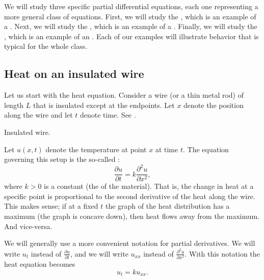 We will study three specific
partial differential equations, each one representing a
more general class of equations.  First, we will study the
\emph{}, which is an example of
a \emph{}.  Next, we will study the
\emph{}, which is an example of
a \emph{}.  Finally, we will study the
\emph{}, which is an example of
an \emph{}.  Each of our examples will illustrate
behavior that is typical for the whole class.

\subsection{Heat on an insulated wire}

Let us start with the heat equation.
Consider a wire (or a thin metal rod) of length $L$
that is insulated
except at the
endpoints.  Let $x$ denote the position along the wire and let $t$ denote
time.  See .

\begin{myfig}
\capstart
{}
\caption{Insulated wire.\label{heat:wirefig}}
\end{myfig}

Let $u(x,t)$ denote the temperature at point $x$ at time $t$.
The equation governing this setup is the
so-called \emph{}:
\begin{equation*}
\boxed{~~
\frac{\partial u}{\partial t} =
k \frac{\partial^2 u}{\partial x^2} ,
~~}
\end{equation*}
where $k > 0$ is a constant (the \emph{} of the material).
That is, the change in heat at a specific point is proportional to the second
derivative of the heat along the wire.  This makes sense;
if at a fixed $t$
the graph of the heat distribution has a maximum (the graph is concave down),
then heat flows away from the maximum.  And vice-versa.

We will generally use a more convenient notation for partial derivatives.
We will write $u_t$ instead of $\frac{\partial u}{\partial t}$,
and we will write $u_{xx}$ instead of $\frac{\partial^2 u}{\partial x^2}$.
With this notation the heat equation becomes
\begin{equation*}
u_t = k u_{xx} .
\end{equation*}

